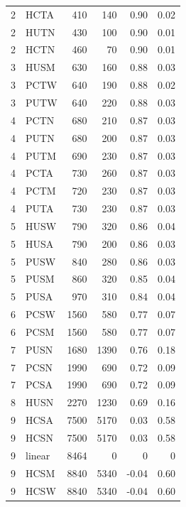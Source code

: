 \documentclass{svjour3}
\theoremstyle{break}
\begin{document}
\begin{table}
\begin{center}
{{\begin{tabular}{l@{~~~}l@{~~~}r@{~~~}r@{~~~}r@{~~~}r}
  2 &         HCTA &    410  &  140 & 0.90 & 0.02 \\
  2 &         HUTN &    430  &  100 & 0.90 & 0.01 \\
  \rowcolor{red!30}
  2 &         HCTN &    460  &  70 & 0.90 & 0.01 \\
\hline  3 &         HUSM &    630  &  160 & 0.88 & 0.03 \\
\rowcolor{red!30}
  3 &         PCTW &    640  &  190 & 0.88 & 0.02 \\
  3 &         PUTW &    640  &  220 & 0.88 & 0.03 \\
\hline  4 &         PCTN &    680  &  210 & 0.87 & 0.03 \\
  4 &         PUTN &    680  &  200 & 0.87 & 0.03 \\
  4 &         PUTM &    690  &  230 & 0.87 & 0.03 \\
  4 &         PCTA &    730  &  260 & 0.87 & 0.03 \\
  4 &         PCTM &    720  &  230 & 0.87 & 0.03 \\
  4 &         PUTA &    730  &  230 & 0.87 & 0.03 \\
\hline  5 &         HUSW &    790  &  320 & 0.86 & 0.04 \\
  5 &         HUSA &    790  &  200 & 0.86 & 0.03 \\
  5 &         PUSW &    840  &  280 & 0.86 & 0.03 \\
  5 &         PUSM &    860  &  320 & 0.85 & 0.04 \\
  \rowcolor{red!30}
  5 &         PUSA &    970  &  310 & 0.84 & 0.04 \\
\hline  6 &         PCSW &    1560  &  580 & 0.77 & 0.07 \\
  6 &         PCSM &    1560  &  580 & 0.77 & 0.07 \\
\hline  7 &         PUSN &    1680  &  1390 & 0.76 & 0.18 \\
  7 &         PCSN &    1990  &  690 & 0.72 & 0.09 \\
  7 &         PCSA &    1990  &  690 & 0.72 & 0.09 \\
\hline  8 &         HUSN &    2270  &  1230 & 0.69 & 0.16 \\
\hline  9 &         HCSA &    7500  &  5170 & 0.03 & 0.58 \\
  9 &         HCSN &    7500  &  5170 & 0.03 & 0.58 \\
   \rowcolor{blue!50}
  9 &       linear &    8464  &  0 & 0 & 0 \\
  9 &         HCSM &    8840  &  5340 & -0.04 & 0.60 \\
  9 &         HCSW &    8840  &  5340 & -0.04 & 0.60 \\
\hline \end{tabular}}
}



\end{center}
\end{table}
\end{document}
